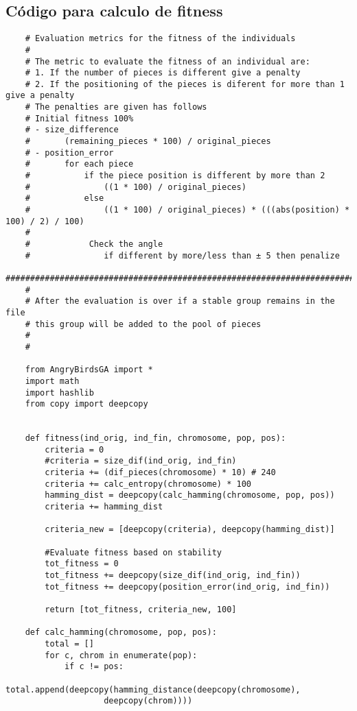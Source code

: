 \subsection{Código para calculo de fitness}
\label{appa:code_fitness}
\begin{verbatim}
    # Evaluation metrics for the fitness of the individuals
    #
    # The metric to evaluate the fitness of an individual are:
    # 1. If the number of pieces is different give a penalty
    # 2. If the positioning of the pieces is diferent for more than 1 give a penalty
    # The penalties are given has follows
    # Initial fitness 100%
    # - size_difference 
    #       (remaining_pieces * 100) / original_pieces
    # - position_error
    #       for each piece
    #           if the piece position is different by more than 2
    #               ((1 * 100) / original_pieces)
    #           else
    #               ((1 * 100) / original_pieces) * (((abs(position) * 100) / 2) / 100)
    # 
    #            Check the angle
    #               if different by more/less than ± 5 then penalize
    #####################################################################################
    #
    # After the evaluation is over if a stable group remains in the file
    # this group will be added to the pool of pieces
    # 
    #

    from AngryBirdsGA import *
    import math
    import hashlib
    from copy import deepcopy


    def fitness(ind_orig, ind_fin, chromosome, pop, pos):
        criteria = 0
        #criteria = size_dif(ind_orig, ind_fin)
        criteria += (dif_pieces(chromosome) * 10) # 240
        criteria += calc_entropy(chromosome) * 100
        hamming_dist = deepcopy(calc_hamming(chromosome, pop, pos))
        criteria += hamming_dist
        
        criteria_new = [deepcopy(criteria), deepcopy(hamming_dist)]
        
        #Evaluate fitness based on stability
        tot_fitness = 0
        tot_fitness += deepcopy(size_dif(ind_orig, ind_fin))
        tot_fitness += deepcopy(position_error(ind_orig, ind_fin))
        
        return [tot_fitness, criteria_new, 100]

    def calc_hamming(chromosome, pop, pos):
        total = []
        for c, chrom in enumerate(pop):
            if c != pos:
                total.append(deepcopy(hamming_distance(deepcopy(chromosome), 
                    deepcopy(chrom))))


\end{verbatim}

